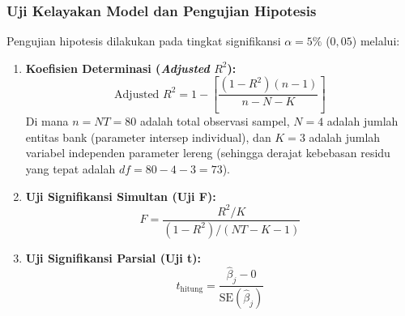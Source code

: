 \documentclass[12pt,a4paper]{article}
\numberwithin{equation}{section}
\begin{document}
\subsubsection{Uji Kelayakan Model dan Pengujian Hipotesis}
\noindent
Pengujian hipotesis dilakukan pada tingkat signifikansi $\alpha = 5\%$ ($0{,}05$) melalui:
\begin{enumerate}
  \item \textbf{Koefisien Determinasi (\emph{Adjusted} $R^2$):}
    \begin{equation}
      \text{Adjusted } R^2 = 1 - \left[ \frac{(1 - R^2)(n - 1)}{n - N - K} \right]
    \end{equation}
    Di mana $n = NT = 80$ adalah total observasi sampel, $N = 4$ adalah jumlah entitas bank (parameter intersep individual), dan $K = 3$ adalah jumlah variabel independen parameter lereng (sehingga derajat kebebasan residu yang tepat adalah $df = 80 - 4 - 3 = 73$).
  \item \textbf{Uji Signifikansi Simultan (Uji F):}
    \begin{equation}
      F = \frac{R^2 / K}{(1 - R^2) / (NT - K - 1)}
    \end{equation}
  \item \textbf{Uji Signifikansi Parsial (Uji t):}
    \begin{equation}
      t_{\text{hitung}} = \frac{\hat{\beta}_j - 0}{\text{SE}(\hat{\beta}_j)}
    \end{equation}
\end{enumerate}
\end{document}
